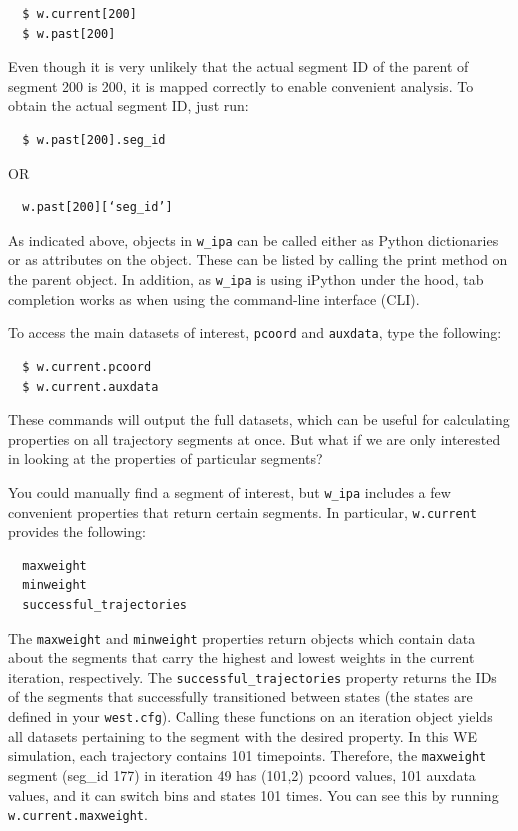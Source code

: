 \begin{verbatim}
  $ w.current[200]
  $ w.past[200]
\end{verbatim}

Even though it is very unlikely that the actual segment ID of the parent of segment 200 is 200, it is mapped correctly to enable convenient analysis. 
To obtain the actual segment ID, just run:

\begin{verbatim}
  $ w.past[200].seg_id
\end{verbatim}
OR
\begin{verbatim}
  w.past[200][‘seg_id’]
\end{verbatim}

As indicated above, objects in \verb|w_ipa| can be called either as Python dictionaries or as attributes on the object. 
These can be listed by calling the print method on the parent object. 
In addition, as \verb|w_ipa| is using iPython under the hood, tab completion works as when using the command-line interface (CLI).

To access the main datasets of interest, \verb|pcoord| and \verb|auxdata|, type the following: 
\begin{verbatim}
  $ w.current.pcoord
  $ w.current.auxdata
\end{verbatim}

These commands will output the full datasets, which can be useful for calculating properties on all trajectory segments at once. 
But what if we are only interested in looking at the properties of particular segments?

You could manually find a segment of interest, but \verb|w_ipa| includes a few convenient properties that return certain segments. 
In particular, \verb|w.current| provides the following:

\begin{verbatim}
  maxweight
  minweight
  successful_trajectories
\end{verbatim}

The \verb|maxweight| and \verb|minweight| properties return objects which contain data about the segments that carry the highest and lowest weights in the current iteration, respectively. 
The \verb|successful_trajectories| property returns the IDs of the segments that successfully transitioned between states  (the states are defined in your \verb|west.cfg|). 
Calling these functions on an iteration object yields all datasets pertaining to the segment with the desired property. 
In this WE simulation, each trajectory contains 101 timepoints. 
Therefore, the \verb|maxweight| segment (seg\_id 177) in iteration 49 has (101,2) pcoord values, 101 auxdata values, and it can switch bins and states 101 times. 
You can see this by running \verb|w.current.maxweight|.
 
